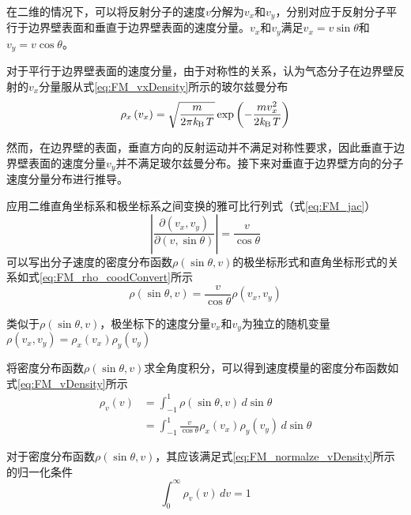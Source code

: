     在二维的情况下，可以将反射分子的速度$v$分解为$v_x$和$v_y$，分别对应于反射分子平行于边界壁表面和垂直于边界壁表面的速度分量。$v_x$和$v_y$满足$v_x=v\sin\theta$和$v_y=v\cos\theta$。

    对于平行于边界壁表面的速度分量，由于对称性的关系，认为气态分子在边界壁反射的$v_x$分量服从式\eqref{eq:FM_vxDensity}所示的玻尔兹曼分布\chinesecolon
    \begin{equation}
        \label{eq:FM_vxDensity}
        \rho_x\left(v_x\right)=\sqrt{\frac{m}{2\pi\it k_{\rm B} \it T}}\exp\left({-\frac{mv_x^2}{2\it k_{\rm B} \it T}}\right)
    \end{equation}

    然而，在边界壁的表面，垂直方向的反射运动并不满足对称性要求，因此垂直于边界壁表面的速度分量$v_y$并不满足玻尔兹曼分布。接下来对垂直于边界壁方向的分子速度分量分布进行推导。
    
    应用二维直角坐标系和极坐标系之间变换的雅可比行列式（式\eqref{eq:FM_jac}）\chinesecolon
    \begin{equation}
        \label{eq:FM_jac}
        \left\lvert \frac{\partial \left(v_x,v_y\right)}{\partial \left(v,\sin\theta\right)}\right\rvert=\frac{v}{\cos\theta}
    \end{equation}
    可以写出分子速度的密度分布函数$\rho\left(\sin\theta,v\right)$的极坐标形式和直角坐标形式的关系如式\eqref{eq:FM_rho_coodConvert}所示\chinesecolon
    \begin{equation}
        \label{eq:FM_rho_coodConvert}
        \rho\left(\sin\theta, v\right)=\frac{v}{\cos\theta}\rho\left(v_x,v_y\right)
    \end{equation}

    类似于$\rho\left(\sin\theta,v\right)$，极坐标下的速度分量$v_x$和$v_y$为独立的随机变量$\rho\left(v_x,v_y\right)=\rho_x\left(v_x\right)\rho_y\left(v_y\right)$

    将密度分布函数$\rho\left(\sin\theta,v\right)$求全角度积分，可以得到速度模量的密度分布函数如式\eqref{eq:FM_vDensity}所示
    \begin{equation}
        \label{eq:FM_vDensity}
        \begin{split}
            \rho_v\left(v\right)&=\int_{-1}^{1} \rho\left(\sin\theta,v\right) \,d\sin\theta \\[+1ex]
            &= \int_{-1}^{1} \frac{v}{\cos\theta} \rho_x\left(v_x\right)\rho_y\left(v_y\right) \,d\sin\theta
        \end{split}
    \end{equation}

    对于密度分布函数$\rho\left(\sin\theta,v\right)$，其应该满足式\eqref{eq:FM_normalze_vDensity}所示的归一化条件\chinesecolon
    \begin{equation}
        \label{eq:FM_normalze_vDensity}
        \int_{0}^{\infty} \rho_v\left(v\right) \,dv = 1
    \end{equation}
    
